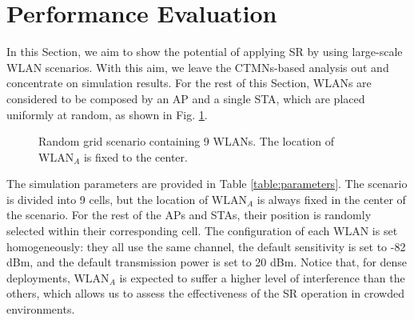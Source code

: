 \documentclass[comsoc]{IEEEtran}
\begin{document}
	
	\section{Performance Evaluation}
	\label{section:performance_evaluation}

	In this Section, we aim to show the potential of applying SR by using large-scale WLAN scenarios. With this aim, we leave the CTMNs-based analysis out and concentrate on simulation results. For the rest of this Section, WLANs are considered to be composed by an AP and a single STA, which are placed uniformly at random, as shown in Fig. \ref{fig:random_scenario}. 
	
	\begin{figure}[ht!]
		\centering
		\caption{Random grid scenario containing 9 WLANs. The location of $\text{WLAN}_A$ is fixed to the center.}
		\label{fig:random_scenario}
	\end{figure}

    The simulation parameters are provided in Table \ref{table:parameters}. The scenario is divided into 9 cells, but the location of $\text{WLAN}_A$ is always fixed in the center of the scenario. For the rest of the APs and STAs, their position is randomly selected within their corresponding cell. The configuration of each WLAN is set homogeneously: they all use the same channel, the default sensitivity is set to -82 dBm, and the default transmission power is set to 20 dBm. Notice that, for dense deployments, $\text{WLAN}_A$ is expected to suffer a higher level of interference than the others, which allows us to assess the effectiveness of the SR operation in crowded environments.
\end{document}
